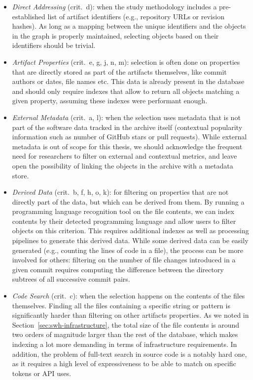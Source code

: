 \begin{itemize}
    \setlength\itemsep{0em}
\item \emph{Direct Addressing} (crit.\ d): when the study methodology includes
    a pre-established list of artifact identifiers (e.g., repository URLs or
    revision hashes). As long as a mapping between the unique identifiers and
    the objects in the graph is properly maintained, selecting objects based on
    their identifiers should be trivial.

\item \emph{Artifact Properties} (crit.\ e, g, j, n, m): selection is
    often done on properties that are directly stored as part of the artifacts
    themselves, like commit authors or dates, file names etc. This data is
    already present in the database and should only require indexes that allow
    to return all objects matching a given property, assuming these indexes
    were performant enough.

\item \emph{External Metadata} (crit.\ a, l): when the selection uses
    metadata that is not part of the software data tracked in the archive
    itself (contextual popularity information such as number of GitHub stars or
    pull requests). While external metadata is out of scope for this thesis, we
    should acknowledge the frequent need for researchers to filter on
    external and contextual metrics, and leave open the possibility of linking
    the objects in the archive with a metadata store.

\item \emph{Derived Data} (crit.\ b, f, h, o, k): for filtering on properties
    that are not directly part of the data, but which can be derived from them.
    By running a programming language recognition tool on the file contents, we
    can index contents by their detected programming language and allow users
    to filter objects on this criterion. This requires additional indexes as
    well as processing pipelines to generate this derived data.  While some
    derived data can be easily generated (e.g., counting the lines of code in
    a file), the process can be more involved for others: filtering on the
    number of file changes introduced in a given commit requires computing the
    difference between the directory subtrees of all successive commit pairs.

\item \emph{Code Search} (crit.\ c): when the selection happens on the contents
    of the files themselves. Finding all the files containing a specific string
    or pattern is significantly harder than filtering on other artifacts
    properties. As we noted in Section~\ref{sec:swh-infrastructure}, the
    total size of the file contents is around two orders of magnitude larger
    than the rest of the database, which makes indexing a lot more demanding in
    terms of infrastructure requirements. In addition, the problem of full-text
    search in source code is a notably hard one, as it requires a high level of
    expressiveness to be able to match on specific tokens or API uses.
\end{itemize}

